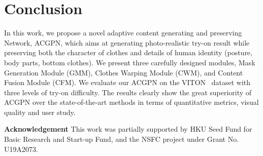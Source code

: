 \documentclass[10pt,twocolumn,letterpaper]{article}
\begin{document}
\section{Conclusion}
In this work, we propose a novel adaptive content generating and preserving Network, \ie ACGPN, which aims at generating photo-realistic try-on result while preserving both the character of clothes and details of human identity (posture, body parts, bottom clothes).
We present three carefully designed modules, \ie Mask Generation Module (GMM), Clothes Warping Module (CWM), and Content Fusion Module (CFM).
We evaluate our ACGPN on the VITON~\cite{DBLP:conf/cvpr/HanWWYD18} dataset with three levels of try-on difficulty.
The results clearly show the great superiority of ACGPN over the state-of-the-art methods in terms of quantitative metrics, visual quality and user study.

\small{
\textbf{Acknowledgement}
This work was partially supported by HKU Seed Fund for Basic Research and Start-up Fund, and the NSFC project under Grant No. U19A2073. }


{\small


}

\clearpage{}





\begin{figure}[htb]

\end{figure}
\vspace{-20pt}
\end{document}
